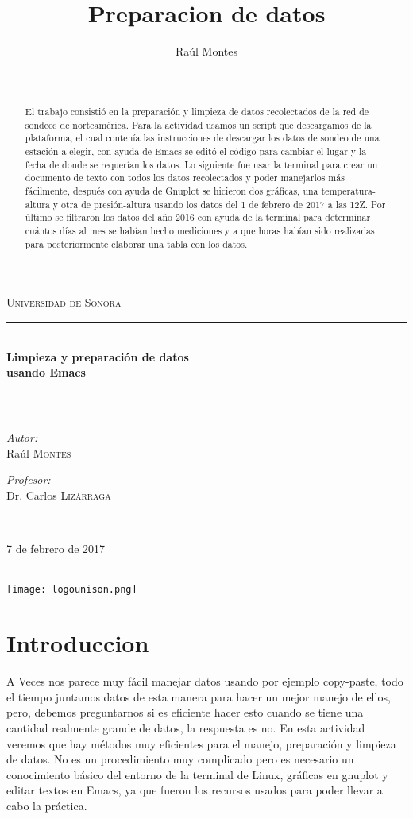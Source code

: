 \documentclass[11pt]{article}
\title{Preparacion de datos}
\author{Raúl Montes}
\begin{document}
\begin{titlepage}
\newcommand{\HRule}{\rule{\linewidth}{0.5mm}}
\center
\textsc{\LARGE Universidad de Sonora}\\[1.5cm]
\HRule \\[0.4cm]
{ \huge \bfseries Limpieza y preparación de datos}\\[0.2cm] 
{ \huge \bfseries usando Emacs}\\[0.4cm] 
\HRule \\[1.1cm]
\begin{minipage}{0.4\textwidth}
\begin{flushleft} \large
\emph{Autor:}\\
Raúl \textsc{Montes} 
\end{flushleft}
\end{minipage}
\begin{minipage}{0.4\textwidth}
\begin{flushright} \large
\emph{Profesor:} \\
Dr. Carlos \textsc{Lizárraga} 
\end{flushright}
\end{minipage}\\[1.5cm]
{\date\ 7 de febrero de 2017\large }\\[2cm] 
\texttt{[image: logounison.png]}\\[1cm] 
\end{titlepage}

\renewcommand{\abstractname}{Resumen}
\begin{abstract}
El trabajo consistió en la preparación y limpieza de datos recolectados de la red de sondeos de norteamérica. Para la actividad usamos un script que descargamos de la plataforma, el cual contenía las instrucciones de descargar los datos de sondeo de una estación a elegir, con ayuda de Emacs se editó el código para cambiar el lugar y la fecha de donde se requerían los datos. Lo siguiente fue usar la terminal para crear un documento de texto con todos los datos recolectados y poder manejarlos más fácilmente, después con ayuda de Gnuplot se hicieron dos gráficas, una temperatura-altura y otra de presión-altura usando los datos del 1 de febrero de 2017 a las 12Z. Por último se filtraron los datos del año 2016 con ayuda de la terminal para determinar cuántos días al mes se habían hecho mediciones y a que horas habían sido realizadas para posteriormente elaborar una tabla con los datos.
\end{abstract}
\section*{Introduccion}
A Veces nos parece muy fácil manejar datos usando por ejemplo copy-paste, todo el tiempo juntamos datos de esta manera para hacer un mejor manejo de ellos, pero, debemos preguntarnos si es eficiente hacer esto cuando se tiene una cantidad realmente grande de datos, la respuesta es no. En esta actividad veremos que hay métodos muy eficientes para el manejo, preparación y limpieza de datos. No es un procedimiento muy complicado pero es necesario un conocimiento básico del entorno de la terminal de Linux, gráficas en gnuplot y editar textos en Emacs, ya que fueron los recursos usados para poder llevar a cabo la práctica.
\end{document}
